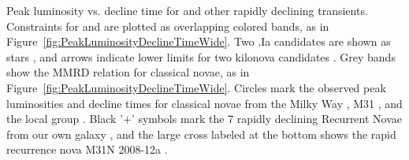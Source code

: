 \label{fig:PeakLuminosityDeclineTime}
Peak luminosity vs. decline time for \spock and other rapidly
declining transients.  Constraints for \spockone and \spocktwo are
plotted as overlapping colored bands, as in
Figure~\ref{fig:PeakLuminosityDeclineTimeWide}.  Two .Ia candidates
are shown as stars \citep{Kasliwal:2010,Poznanski:2010}, and arrows
indicate lower limits for two kilonova
candidates \citep{Perley:2009,Tanvir:2013}.  Grey bands show the MMRD
relation for classical novae, as in
Figure~\ref{fig:PeakLuminosityDeclineTimeWide}.  Circles mark the
observed peak luminosities and decline times for classical novae from
the Milky Way \citep{Downes:2000}, M31 \citep{Shafter:2011}, and the
local group \citep{Kasliwal:2011b}.  Black '+' symbols mark the 7 rapidly declining Recurrent Novae from our own galaxy \citep{Schaefer:2010}, and the large cross labeled at the bottom shows the rapid recurrence nova
M31N 2008-12a \citep{Tang:2014,Darnley:2015}.
